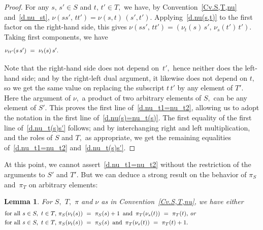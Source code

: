 \documentclass{amsart}
\newtheorem{lemma}[theorem]{Lemma}
\numberwithin{equation}{section}
\numberwithin{theorem}{section}
\begin{document}
\begin{proof}
For any $s,\,s'\in S$ and $t,\,t'\in T,$ we have,
by Convention~\ref{Cv.S,T,nu} and~\eqref{d.nu_st},
$\nu(s s',\,t t') = \nu(s, t)\,(s', t').$
Applying~\eqref{d.nu(s,t)} to the first factor on the right-hand side,
this gives $\nu(s s',\,t t') = (\nu_{t}(s)\,s',\,\nu_{s}(t')\,t').$
Taking first components, we have
%
\begin{equation}\begin{minipage}[c]{35pc}\label{d.nu(t_t')}
$\nu_{t t'}(s\,s')~=~\nu_{t}(s)\,s'.$
\end{minipage}\end{equation}

Note that the right-hand side does not depend on~$t',$
hence neither does the left-hand side; and by the
right-left dual argument, it likewise does not depend on $t,$
so we get the same value on replacing the subscript $t\,t'$ by
any element of $T'.$
Here the argument of $\nu,$ a product of two
arbitrary elements of $S,$ can be any element of $S'.$
This proves the first line of~\eqref{d.nu_t1=nu_t2},
allowing us to adopt the notation in the first line
of~\eqref{d.nu(s)=nu_t(s)}.
The first equality
of the first line of~\eqref{d.nu_t(s)s'} follows; and
by interchanging right and left multiplication, and
the roles of $S$ and $T,$ as appropriate, we
get the remaining equalities
of~\eqref{d.nu_t1=nu_t2} and~\eqref{d.nu_t(s)s'}.
\end{proof}

At this point, we cannot assert~\eqref{d.nu_t1=nu_t2}
without the restriction of the arguments to $S'$ and $T'.$
But we can deduce a strong result on the behavior of
$\pi_S$ and~$\pi_T$ on arbitrary elements:

\begin{lemma}\label{L.S_or_T}
For $S,$ $T,$ $\pi$ and $\nu$ as in Convention~\ref{Cv.S,T,nu}, we have
{\em either}
%
\begin{equation}\begin{minipage}[c]{35pc}\label{d.pi_S_nu_t}
for all $s\in S,~t\in T,$ $\pi_S(\nu_t(s))~=~\pi_S(s)+1\,$
and\, $\pi_T(\nu_s(t))~=~\pi_T(t),$ {\em or}\\[.3em]
%
for all $s\in S,~t\in T,$
$\pi_S(\nu_t(s))~=~\pi_S(s)\,$ and\, $\pi_T(\nu_s(t))~=~\pi_T(t)+1.$
\end{minipage}\end{equation}
%
\end{lemma}
\end{document}
